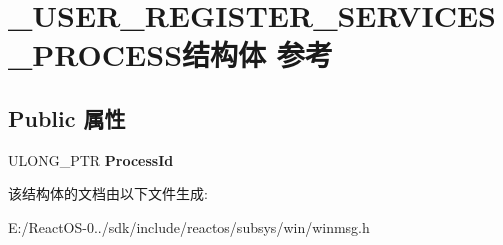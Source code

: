 \hypertarget{struct___u_s_e_r___r_e_g_i_s_t_e_r___s_e_r_v_i_c_e_s___p_r_o_c_e_s_s}{}\section{\+\_\+\+U\+S\+E\+R\+\_\+\+R\+E\+G\+I\+S\+T\+E\+R\+\_\+\+S\+E\+R\+V\+I\+C\+E\+S\+\_\+\+P\+R\+O\+C\+E\+S\+S结构体 参考}
\label{struct___u_s_e_r___r_e_g_i_s_t_e_r___s_e_r_v_i_c_e_s___p_r_o_c_e_s_s}
\subsection*{Public 属性}
\begin{DoxyCompactItemize}
\item 
\mbox{\label{struct___u_s_e_r___r_e_g_i_s_t_e_r___s_e_r_v_i_c_e_s___p_r_o_c_e_s_s_aea655ed66c444ba7899e7ee8f28583aa}} 
U\+L\+O\+N\+G\+\_\+\+P\+TR {\bfseries Process\+Id}
\end{DoxyCompactItemize}


该结构体的文档由以下文件生成\+:\begin{DoxyCompactItemize}
\item 
E\+:/\+React\+O\+S-\/0../sdk/include/reactos/subsys/win/winmsg.\+h\end{DoxyCompactItemize}
